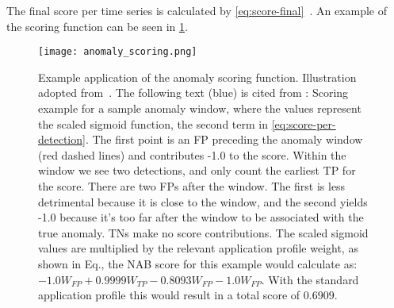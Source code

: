 The final score per time series is calculated by \cref{eq:score-final}~\cite[cf][]{Lavin.2015}.
An example of the scoring function can be seen in \cref{fig:anomaly-score-example}.

\begin{figure}[htp!]
    \centering
    \texttt{[image: anomaly\_scoring.png]}
    \caption[Example of anomaly scoring function]{Example application of the anomaly
    scoring function. Illustration adopted from~\cite{Lavin.2015}. The following
    text (blue) is cited from \textcite{Lavin.2015}:
    {\color{blue}
    Scoring example for a sample anomaly window, where the values
    represent the scaled sigmoid function, the second term in \cref{eq:score-per-detection}.
    The first point is an FP preceding the anomaly window (red dashed lines) and
    contributes -1.0 to the score. Within the window we see two detections, and
    only count the earliest TP for the score. There are two FPs after the window.
    The first is less detrimental because it is close to the window, and the second
    yields -1.0 because it’s too far after the window to be associated with the true
    anomaly. TNs make no score contributions. The scaled sigmoid values are
    multiplied by the relevant application profile weight, as shown in Eq.,
    the NAB score for this example would calculate as: 
    \(-1.0W_{FP} + 0.9999W_{TP} - 0.8093W_{FP} - 1.0W_{FP}\).
    With the standard application profile this would result in a total score of
    \(0.6909\).}
    }\label{fig:anomaly-score-example}
\end{figure}\clearpage


